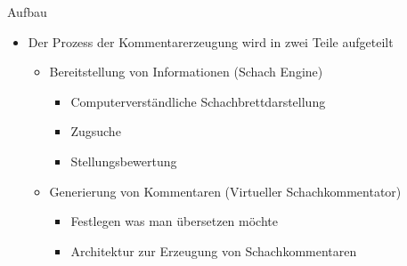 \begin{frame}{Aufbau}
\begin{itemize}
	\item Der Prozess der Kommentarerzeugung wird in zwei Teile aufgeteilt
	\begin{itemize}
		\item Bereitstellung von Informationen (Schach Engine)
		\begin{itemize}
			\item Computerverständliche Schachbrettdarstellung
			\item Zugsuche
			\item Stellungsbewertung
		\end{itemize}
		\item Generierung von Kommentaren (Virtueller Schachkommentator)
		\begin{itemize}
			\item Festlegen was man übersetzen möchte
			\item Architektur zur Erzeugung von Schachkommentaren
		\end{itemize}
	\end{itemize}
\end{itemize}
\end{frame}
